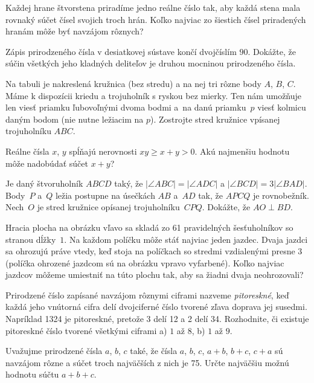 {%
Každej hrane štvorstena priradíme jedno reálne číslo tak, aby každá stena mala rovnaký súčet čísel svojich troch hrán. Koľko najviac zo šiestich čísel priradených hranám môže byť navzájom rôznych?
}

{%
Zápis prirodzeného čísla v desiatkovej sústave končí dvojčíslím $90$. Dokážte, že súčin všetkých jeho kladných deliteľov je druhou mocninou prirodzeného čísla.
}

{%
Na tabuli je nakreslená kružnica (bez stredu) a na nej tri rôzne body $A$, $B$, $C$. Máme k dispozícii kriedu a trojuholník s ryskou bez mierky. Ten nám umožňuje len viesť priamku ľubovoľnými dvoma bodmi a~na danú priamku~$p$ viesť kolmicu daným bodom (nie nutne ležiacim na $p$). Zostrojte stred kružnice vpísanej trojuholníku $ABC$.
}

{%
Reálne čísla $x$, $y$ spĺňajú nerovnosti $xy \ge x+y > 0$. Akú najmenšiu hodnotu môže nadobúdať súčet $x+y$?
}

{%
Je daný štvoruholník $ABCD$ taký, že $|\angle ABC|=|\angle ADC|$ a $|\angle BCD|=3|\angle BAD|$. Body~$P$ a~$Q$ ležia postupne na úsečkách $AB$ a~$AD$ tak, že $APCQ$ je rovnobežník. Nech~$O$ je stred kružnice opísanej trojuholníku~$CPQ$. Dokážte, že $AO \perp BD$.
}

{%
Hracia plocha na obrázku vľavo sa skladá zo 61 pravidelných šesťuholníkov so stranou dĺžky~$1$. Na každom políčku môže stáť najviac jeden jazdec. Dvaja jazdci sa ohrozujú práve vtedy, keď stoja na políčkach so stredmi vzdialenými presne $3$ (políčka ohrozené jazdcom sú na obrázku vpravo vyfarbené). Koľko najviac jazdcov môžeme umiestniť na túto plochu tak, aby sa žiadni dvaja neohrozovali?
%
}

{%
Prirodzené číslo zapísané navzájom rôznymi ciframi nazveme {\it pitoreskné}, keď každá jeho vnútorná cifra delí dvojciferné číslo tvorené zľava doprava jej susedmi. Napríklad 1324 je pitoreskné, pretože 3 delí 12 a 2 delí 34. Rozhodnite, či existuje pitoreskné číslo tvorené všetkými ciframi a) $1$ až $8$, b) $1$ až $9$.
}

{%
Uvažujme prirodzené čísla $a$, $b$, $c$ také, že čísla $a$, $b$, $c$, $a+b$, $b+c$, $c+a$ sú navzájom rôzne a súčet troch najväčších z nich je 75. Určte najväčšiu možnú hodnotu súčtu $a+b+c$.
}

